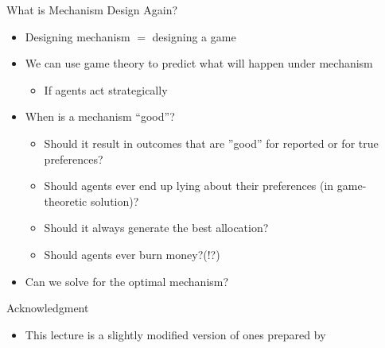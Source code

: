 \documentclass[11pt,aspectratio=169,handout]{beamer}
\begin{document}
  \begin{frame}{What is Mechanism Design Again?}
   \begin{itemize}[<+->]
   \setlength{\itemsep}{1.2em}
    \item Designing mechanism $=$ designing a game
    \item We can use game theory to predict what will happen under mechanism
    \begin{itemize}
     \item If agents act strategically
    \end{itemize}     
    \item When is a mechanism ``good''?
    \begin{itemize}
     \item Should it result in outcomes that are ''good'' for \alert{reported} or for \alert{true} preferences?
     \item Should agents ever end up lying about their preferences (in game-theoretic solution)?
     \item Should it always generate the best allocation?
     \item Should agents ever burn money?(!?)
    \end{itemize}
    \item Can we solve for the optimal mechanism?
   \end{itemize}
  \end{frame}
  
  \begin{frame}{Acknowledgment}
   \begin{itemize}
    \setlength{\itemsep}{1em}
    \item This lecture is a slightly modified version of ones prepared by
   \end{itemize}
  \end{frame}
 
\end{document}
